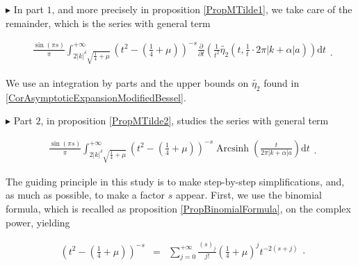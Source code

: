 \documentclass{jams-l}
\theoremstyle{definition}
\theoremstyle{remark}
\numberwithin{equation}{section}
\DeclareMathOperator{\arcsinh}{Arcsinh}
\begin{document}
            
            \medskip
            
            \hspace{30pt} $\blacktriangleright$ In part $1$, and more precisely in proposition \ref{PropMTilde1}, we take care of the remainder, which is the series with general term
            
                \[ \begin{array}{c}
                        \frac{\sin \left( \pi s \right)}{\pi} \int_{2 \left \vert k \right \vert^{\delta} \sqrt{\frac{1}{4} + \mu}}^{+ \infty} \left( t^2 - \left( \frac{1}{4} + \mu \right) \right)^{-s} \frac{\partial}{\partial t} \left( \frac{1}{t^2} \widetilde{\eta_2} \left( t, \frac{1}{t} \cdot 2 \pi \left \vert k + \alpha \right \vert a \right) \right) \mathrm{d}t
                    \end{array} . \]
                
                \noindent We use an integration by parts and the upper bounds on $\widetilde{\eta_2}$ found in \ref{CorAsymptoticExpansionModifiedBessel}.
                
                
            \medskip
            
            \hspace{30pt} $\blacktriangleright$ Part $2$, in proposition \ref{PropMTilde2}, studies the series with general term
                
                \[ \begin{array}{c}
                        \frac{\sin \left( \pi s \right)}{\pi} \int_{2 \left \vert k \right \vert^{\delta} \sqrt{\frac{1}{4} + \mu}}^{+ \infty} \left( t^2 - \left( \frac{1}{4} + \mu \right) \right)^{-s} \arcsinh \left( \frac{t}{2 \pi \left \vert k + \alpha \right \vert a} \right) \mathrm{d}t
                    \end{array} . \]
                    
                \noindent The guiding principle in this study is to make step-by-step simplifications, and, as much as possible, to make a factor $s$ appear. First, we use the binomial formula, which is recalled as proposition \ref{PropBinomialFormula}, on the complex power, yielding
                
                \[ \begin{array}{lll}
                        \left( t^2 - \left( \frac{1}{4} + \mu \right) \right)^{-s} & = & \sum\limits_{j = 0}^{+ \infty} \frac{\left( s \right)_j}{j!} \left( \frac{1}{4} + \mu \right)^j t^{-2 \left( s + j \right)}
                    \end{array} . \]
                
\end{document}
